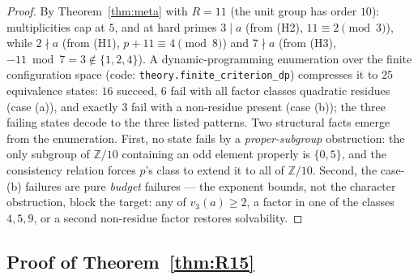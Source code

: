 \documentclass[11pt]{article}
\theoremstyle{plain}
\theoremstyle{remark}
\theoremstyle{plain}
\numberwithin{equation}{section}
\begin{document}
\begin{proof}
By Theorem~\ref{thm:meta} with $R = 11$ (the unit group has order
$10$): multiplicities cap at
$5$, and at hard primes $3 \mid a$ (from (H2), $11 \equiv 2 \pmod 3$),
while $2 \nmid a$ (from (H1), $p + 11 \equiv 4 \pmod 8$) and $7 \nmid a$
(from (H3), $-11 \bmod 7 = 3 \notin \{1,2,4\}$). A dynamic-programming
enumeration over the finite configuration space
(code: \texttt{theory.finite\_criterion\_dp}) compresses it to $25$
equivalence states: $16$ succeed, $6$ fail with all factor classes
quadratic residues (case (a)), and exactly $3$ fail with a non-residue
present (case (b)); the three failing states decode to the three listed
patterns. Two structural facts emerge from the enumeration. First, no
state fails by a \emph{proper-subgroup} obstruction: the only subgroup of
$\mathbb{Z}/10$ containing an odd element properly is $\{0, 5\}$, and the
consistency relation forces $p$'s class to extend it to all of
$\mathbb{Z}/10$. Second, the case-(b) failures are pure \emph{budget}
failures --- the exponent bounds, not the character obstruction, block
the target: any of $v_3(a) \ge 2$, a factor in one of the classes
$4, 5, 9$, or a
second non-residue factor restores solvability.
\end{proof}

\subsection{Proof of Theorem~\ref{thm:R15}}
\end{document}
